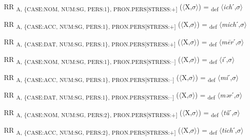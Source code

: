 {\begin{exe}
 RR \textsubscript{A, \{CASE:NOM, NUM:SG, PERS:1\}, PRON.PERS[STRESS:+]} ($\langle$X,$\sigma $$\rangle$) = \textsubscript{def} $\langle$\textit{ich}ˊ,$\sigma $$\rangle$
\end{exe}

\begin{exe}
  RR \textsubscript{A, \{CASE:ACC, NUM:SG, PERS:1\}, PRON.PERS[STRESS:+]} ($\langle$X,$\sigma $$\rangle$) = \textsubscript{def} $\langle$\textit{mich}ˊ,$\sigma $$\rangle$
\end{exe}

\begin{exe}
 RR \textsubscript{A, \{CASE:DAT, NUM:SG, PERS:1\}, PRON.PERS[STRESS:+]} ($\langle$X,$\sigma $$\rangle$) = \textsubscript{def} $\langle$\textit{m\=er}ˊ,$\sigma $$\rangle$
\end{exe}

\begin{exe}
 RR \textsubscript{A, \{CASE:NOM, NUM:SG, PERS:1\}, PRON.PERS[STRESS:–]} ($\langle$X,$\sigma $$\rangle$) = \textsubscript{def} $\langle$\textit{i}ˊ,$\sigma $$\rangle$
\end{exe}

\begin{exe}
 RR \textsubscript{A, \{CASE:ACC, NUM:SG, PERS:1\}, PRON.PERS[STRESS:–]} ($\langle$X,$\sigma $$\rangle$) = \textsubscript{def} $\langle$\textit{mi}ˊ,$\sigma $$\rangle$
\end{exe}

\begin{exe}
 RR \textsubscript{A, \{CASE:DAT, NUM:SG, PERS:1\}, PRON.PERS[STRESS:–]} ($\langle$X,$\sigma $$\rangle$) = \textsubscript{def} $\langle$\textit{mər}ˊ,$\sigma $$\rangle$
\end{exe}

\begin{exe}
 RR \textsubscript{A, \{CASE:NOM, NUM:SG, PERS:2\}, PRON.PERS[STRESS:+]} ($\langle$X,$\sigma $$\rangle$) = \textsubscript{def} $\langle$\textit{tǖ}ˊ,$\sigma $$\rangle$
\end{exe}

\begin{exe}
 RR \textsubscript{A, \{CASE:ACC, NUM:SG, PERS:2\}, PRON.PERS[STRESS:+]} ($\langle$X,$\sigma $$\rangle$) = \textsubscript{def} $\langle$\textit{tich}ˊ,$\sigma $$\rangle$
\end{exe}

}
